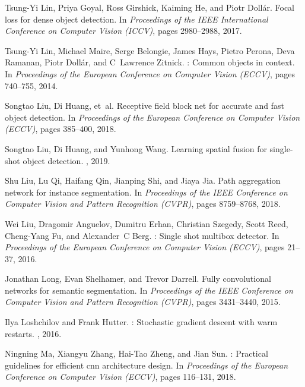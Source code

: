 \documentclass[10pt,twocolumn,letterpaper]{article}
\begin{document}
{\begin{thebibliography}{100}
	Tsung-Yi Lin, Priya Goyal, Ross Girshick, Kaiming He, and Piotr Doll{\'a}r.
	\newblock Focal loss for dense object detection.
	\newblock In {\em Proceedings of the IEEE International Conference on Computer
		Vision (ICCV)}, pages 2980--2988, 2017.
	
	Tsung-Yi Lin, Michael Maire, Serge Belongie, James Hays, Pietro Perona, Deva
	Ramanan, Piotr Doll{\'a}r, and C~Lawrence Zitnick.
	: Common objects in context.
	\newblock In {\em Proceedings of the European Conference on Computer Vision
		(ECCV)}, pages 740--755, 2014.
	
	Songtao Liu, Di Huang, et~al.
	\newblock Receptive field block net for accurate and fast object detection.
	\newblock In {\em Proceedings of the European Conference on Computer Vision
		(ECCV)}, pages 385--400, 2018.
	
	Songtao Liu, Di Huang, and Yunhong Wang.
	\newblock Learning spatial fusion for single-shot object detection.
	, 2019.
	
	Shu Liu, Lu Qi, Haifang Qin, Jianping Shi, and Jiaya Jia.
	\newblock Path aggregation network for instance segmentation.
	\newblock In {\em Proceedings of the IEEE Conference on Computer Vision and
		Pattern Recognition (CVPR)}, pages 8759--8768, 2018.
	
	Wei Liu, Dragomir Anguelov, Dumitru Erhan, Christian Szegedy, Scott Reed,
	Cheng-Yang Fu, and Alexander~C Berg.
	: Single shot multibox detector.
	\newblock In {\em Proceedings of the European Conference on Computer Vision
		(ECCV)}, pages 21--37, 2016.
	
	Jonathan Long, Evan Shelhamer, and Trevor Darrell.
	\newblock Fully convolutional networks for semantic segmentation.
	\newblock In {\em Proceedings of the IEEE Conference on Computer Vision and
		Pattern Recognition (CVPR)}, pages 3431--3440, 2015.
	
	Ilya Loshchilov and Frank Hutter.
	: Stochastic gradient descent with warm restarts.
	, 2016.
	
	Ningning Ma, Xiangyu Zhang, Hai-Tao Zheng, and Jian Sun.
	: Practical guidelines for efficient cnn architecture
	design.
	\newblock In {\em Proceedings of the European Conference on Computer Vision
		(ECCV)}, pages 116--131, 2018.
	

\end{thebibliography}}
\end{document}
